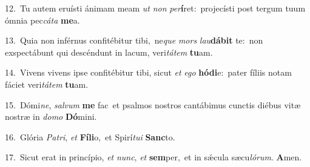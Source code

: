 {\numbfont\textcolor{\numbcolor}{12.}}~Tu autem eruísti ánimam meam \textit{ut} \textit{non} \textit{per}\-\textbf{í}ret:~\star projecísti post tergum tuum ómnia pec\-\textit{cá}\-\textit{ta} \textbf{me}\-a.\par
{\numbfont\textcolor{\numbcolor}{13.}}~Quia non inférnus confitébitur tibi,~\dagger ne\textit{que} \textit{mors} \textit{lau}\-\textbf{dá}\textbf{bit} te:~\star non exspectábunt qui descéndunt in lacum, veri\-\textit{tá}\-\textit{tem} \textbf{tu}\-am.\par
{\numbfont\textcolor{\numbcolor}{14.}}~Vivens vivens ipse confitébitur tibi, sicut \textit{et} \textit{e}\-\textit{go} \textbf{hó}\-\textbf{di}e:~\star pater fíliis notam fáciet veri\-\textit{tá}\-\textit{tem} \textbf{tu}\-am.\par
{\numbfont\textcolor{\numbcolor}{15.}}~Dómi\-\textit{ne}\-, \textit{sal}\-\textit{vum} \textbf{me} fac~\star et psalmos nostros cantábimus cunctis diébus vitæ nostræ in \textit{do}\-\textit{mo} \textbf{Dó}\-mini.\par
{\numbfont\textcolor{\numbcolor}{16.}}~Glória \textit{Pa}\-\textit{tri}, \textit{et} \textbf{Fí}\-\textbf{li}o,~\star et Spirí\-\textit{tu}\-\textit{i} \textbf{Sanc}\-to.\par
{\numbfont\textcolor{\numbcolor}{17.}}~Sicut erat in princípio, \textit{et} \textit{nunc}\-, \textit{et} \textbf{sem}\-per,~\star et in sǽcula sæcu\-\textit{ló}\-\textit{rum}. \textbf{A}\-men.\par
